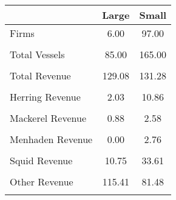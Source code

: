 \begin{tabular}{l*{2}{c}}
\hline\hline
                &    Large&    Small\\
\hline
Firms           &     6.00&    97.00\\
                &         &         \\
Total Vessels   &    85.00&   165.00\\
                &         &         \\
Total Revenue   &   129.08&   131.28\\
                &         &         \\
Herring Revenue &     2.03&    10.86\\
                &         &         \\
Mackerel Revenue&     0.88&     2.58\\
                &         &         \\
Menhaden Revenue&     0.00&     2.76\\
                &         &         \\
Squid Revenue   &    10.75&    33.61\\
                &         &         \\
Other Revenue   &   115.41&    81.48\\
                &         &         \\
\hline\hline
\end{tabular}
